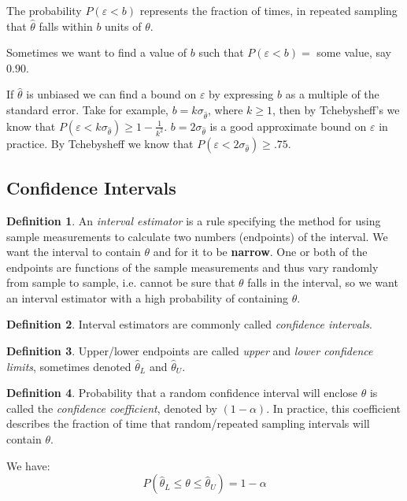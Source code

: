 \documentclass[12 pt]{article}
\theoremstyle{definition}
\newtheorem{defn}{Definition}
\begin{document}
    The probability $P(\varepsilon < b)$ represents the fraction of
    times, in repeated sampling that $\hat{\theta}$ falls within $b$
    units of $\theta$.

    Sometimes we want to find a value of $b$ such that $P(\varepsilon
    < b) =$ some value, say $0.90$.

    If $\hat{\theta}$ is unbiased we can find a bound on $\varepsilon$
    by expressing $b$ as a multiple of the standard error. Take for
    example, $b=k \sigma_{\hat{\theta}}$, where $k \geq 1$, then by
    Tchebysheff's we know that $P(\varepsilon < k
    \sigma_{\hat{\theta}}) \geq 1 -
    \frac{1}{k^2}$. $b=2\sigma_{\hat{\theta}}$ is a good approximate
    bound on $\varepsilon$ in practice. By Tchebysheff we know that
    $P(\varepsilon < 2\sigma_{\hat{\theta}}) \geq .75$.
    \subsection{Confidence Intervals}
    \begin{defn}
      An \textit{interval estimator} is a rule specifying the method
      for using sample measurements to calculate two numbers
      (endpoints) of the interval. We want the interval to contain
      $\theta$ and for it to be \textbf{narrow}. One or both of the
      endpoints are functions of the sample measurements and thus vary
      randomly from sample to sample, i.e. cannot be sure that
      $\theta$ falls in the interval, so we want an interval estimator
      with a high probability of containing $\theta$.
    \end{defn}
    \begin{defn}
      Interval estimators are commonly called \textit{confidence intervals}.
    \end{defn}
    \begin{defn}
      Upper/lower endpoints are called \textit{upper} and
      \textit{lower confidence limits}, sometimes denoted
      $\hat{\theta}_L$ and $\hat{\theta}_U$.
    \end{defn}
    \begin{defn}
      Probability that a random confidence interval will enclose
      $\theta$ is called the \textit{confidence coefficient}, denoted
      by $(1 - \alpha)$. In
      practice, this coefficient describes the fraction of time that
      random/repeated sampling intervals will contain $\theta$.

      We have: $$P(\hat{\theta}_L \leq \theta \leq \hat{\theta}_U) = 1 - \alpha$$
    \end{defn}
\end{document}
